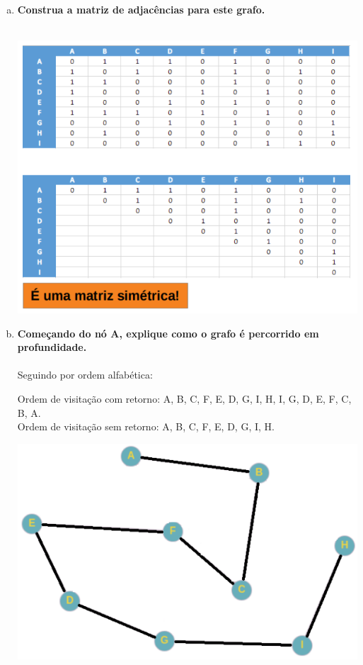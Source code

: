 \documentclass[11pt]{article} %
\begin{document}
	\begin{enumerate}[a)]
		\item {\bf Construa a matriz de adjacências para este grafo.} \\ \\

		\begin{center}
			\includegraphics[scale = 0.7]{q2a.png}
		\end{center}

\newpage

		\item {\bf Começando do nó A, explique como o grafo é percorrido em profundidade.} \\ \\

		Seguindo por ordem alfabética: \vspace{0.3 cm}

Ordem de visitação com retorno: A, B, C, F, E, D, G, I, H, I, G, D, E, F, C, B, A. \\ 
Ordem de visitação sem retorno: A, B, C, F, E, D, G, I, H. \\ 


		\begin{center}
			\includegraphics[scale = 0.7]{q2b.png}
		\end{center}


\end{enumerate}
\end{document}
